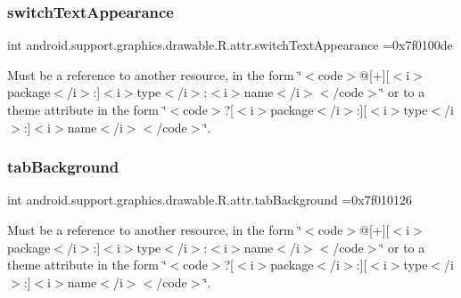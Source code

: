 \subsubsection{\texorpdfstring{switch\+Text\+Appearance}{switchTextAppearance}}
{\footnotesize\ttfamily int android.\+support.\+graphics.\+drawable.\+R.\+attr.\+switch\+Text\+Appearance =0x7f0100de\hspace{0.3cm}{\ttfamily [static]}}

Must be a reference to another resource, in the form \char`\"{}$<$code$>$@\mbox{[}+\mbox{]}\mbox{[}$<$i$>$package$<$/i$>$\+:\mbox{]}$<$i$>$type$<$/i$>$\+:$<$i$>$name$<$/i$>$$<$/code$>$\char`\"{} or to a theme attribute in the form \char`\"{}$<$code$>$?\mbox{[}$<$i$>$package$<$/i$>$\+:\mbox{]}\mbox{[}$<$i$>$type$<$/i$>$\+:\mbox{]}$<$i$>$name$<$/i$>$$<$/code$>$\char`\"{}. \mbox{\label{classandroid_1_1support_1_1graphics_1_1drawable_1_1R_1_1attr_a1c44addf7f395ec12808c6c7ed777643}} 
\subsubsection{\texorpdfstring{tab\+Background}{tabBackground}}
{\footnotesize\ttfamily int android.\+support.\+graphics.\+drawable.\+R.\+attr.\+tab\+Background =0x7f010126\hspace{0.3cm}{\ttfamily [static]}}

Must be a reference to another resource, in the form \char`\"{}$<$code$>$@\mbox{[}+\mbox{]}\mbox{[}$<$i$>$package$<$/i$>$\+:\mbox{]}$<$i$>$type$<$/i$>$\+:$<$i$>$name$<$/i$>$$<$/code$>$\char`\"{} or to a theme attribute in the form \char`\"{}$<$code$>$?\mbox{[}$<$i$>$package$<$/i$>$\+:\mbox{]}\mbox{[}$<$i$>$type$<$/i$>$\+:\mbox{]}$<$i$>$name$<$/i$>$$<$/code$>$\char`\"{}. \mbox{\label{classandroid_1_1support_1_1graphics_1_1drawable_1_1R_1_1attr_a5d8570bb0ee91842cc6184b18c50dbf0}} 
